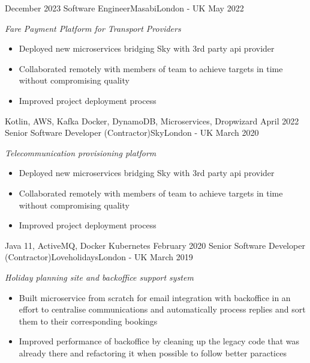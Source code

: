 %
%
%

  \begin{experiences}
    \experience
      {December 2023}
      {Software Engineer}{Masabi}{London - UK}
      {May 2022}
      {
        \emph{Fare Payment Platform for Transport Providers}
        \begin{itemize}
          \item Deployed new microservices bridging Sky with 3rd party api provider
          \item Collaborated remotely with members of team to achieve targets in time without compromising quality
          \item Improved project deployment process
        \end{itemize}
      }
      {Kotlin, AWS, Kafka}
      {Docker, DynamoDB, Microservices, Dropwizard}
    \emptySeparator
    \experience
      {April 2022}
      {Senior Software Developer (Contractor)}{Sky}{London - UK}
      {March 2020}
      {
        \emph{Telecommunication provisioning platform}
        \begin{itemize}
          \item Deployed new microservices bridging Sky with 3rd party api provider
          \item Collaborated remotely with members of team to achieve targets in time without compromising quality
          \item Improved project deployment process
        \end{itemize}
      }
      {Java 11, ActiveMQ, Docker}
      {Kubernetes}
    \emptySeparator
    \experience
      {February 2020}
      {Senior Software Developer (Contractor)}{Loveholidays}{London - UK}
      {March 2019}
      {
        \emph{Holiday planning site and backoffice support system}
        \begin{itemize}
          \item Built microservice from scratch for email integration with backoffice in an effort to centralise communications and automatically process replies and sort them to their corresponding bookings
          \item Improved performance of backoffice by cleaning up the legacy code that was already there and refactoring it when possible to follow better paractices

\end{itemize}}
\end{experiences}
